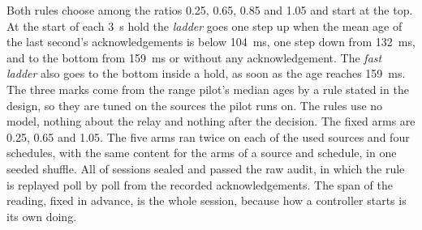 Both rules choose among the ratios 0.25, 0.65, 0.85 and 1.05 and start at the top. At the start of each 3~s hold the \emph{ladder} goes one step up when the mean age of the last second's acknowledgements is below 104~ms, one step down from 132~ms, and to the bottom from 159~ms or without any acknowledgement. The \emph{fast ladder} also goes to the bottom inside a hold, as soon as the age reaches 159~ms. The three marks come from the range pilot's median ages by a rule stated in the design, so they are tuned on the sources the pilot runs on. The rules use no model, nothing about the relay and nothing after the decision. The fixed arms are 0.25, 0.65 and 1.05. The five arms ran twice on each of the \LadderPilotSources{} used sources and four schedules, with the same content for the arms of a source and schedule, in one seeded shuffle. All \LadderPilotSessions{} of \LadderPilotPlanned{} sessions sealed and passed the raw audit, in which the rule is replayed poll by poll from the recorded acknowledgements. The span of the reading, fixed in advance, is the whole session, because how a controller starts is its own doing.

\begin{table}[t]
\centering\small
\resizebox{\linewidth}{!}{}
\caption{Controller development pilot. Mean over sources of each arm over the whole session; one row gives the endpoint from the second change of the cap on. Utility is the endpoint, the on-time sampled PSNR contribution per capture request.}
\label{tab:ladder-pilot-arms}
\end{table}

\begin{table}[t]
\centering\small
\resizebox{\linewidth}{!}{}
\caption{Controller development pilot. Differences within source and schedule over all schedules, with 95\% $t$ intervals over sources; not corrected for the number of comparisons.}
\label{tab:ladder-pilot-differences}
\end{table}

\begin{table}[t]
\centering\small
\resizebox{\linewidth}{!}{}
\caption{Controller development pilot. Differences of the endpoint over the whole session under each schedule, within source, with 95\% $t$ intervals over sources; not corrected for the number of comparisons.}
\label{tab:ladder-pilot-by-schedule}
\end{table}

